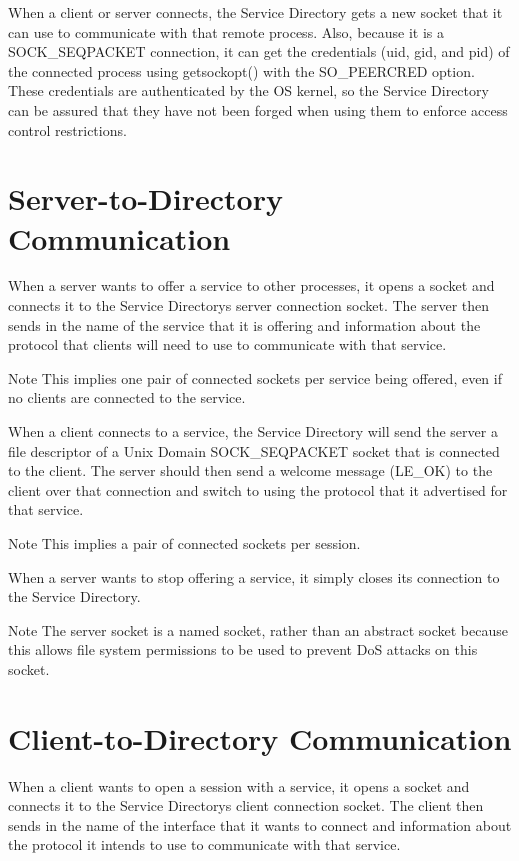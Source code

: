 When a client or server connects, the Service Directory gets a new socket that it can use to communicate with that remote process. Also, because it is a S\+O\+C\+K\+\_\+\+S\+E\+Q\+P\+A\+C\+K\+ET connection, it can get the credentials (uid, gid, and pid) of the connected process using getsockopt() with the S\+O\+\_\+\+P\+E\+E\+R\+C\+R\+ED option. These credentials are authenticated by the OS kernel, so the Service Directory can be assured that they have not been forged when using them to enforce access control restrictions.\hypertarget{serviceDirectoryProtocol_serviceDirectoryProtocol_Servers}{}\section{Server-\/to-\/\+Directory Communication}\label{serviceDirectoryProtocol_serviceDirectoryProtocol_Servers}
When a server wants to offer a service to other processes, it opens a socket and connects it to the Service Directory\textquotesingle{}s server connection socket. The server then sends in the name of the service that it is offering and information about the protocol that clients will need to use to communicate with that service.

\begin{DoxyNote}{Note}
This implies one pair of connected sockets per service being offered, even if no clients are connected to the service.
\end{DoxyNote}
When a client connects to a service, the Service Directory will send the server a file descriptor of a Unix Domain S\+O\+C\+K\+\_\+\+S\+E\+Q\+P\+A\+C\+K\+ET socket that is connected to the client. The server should then send a welcome message (L\+E\+\_\+\+OK) to the client over that connection and switch to using the protocol that it advertised for that service.

\begin{DoxyNote}{Note}
This implies a pair of connected sockets per session.
\end{DoxyNote}
When a server wants to stop offering a service, it simply closes its connection to the Service Directory.

\begin{DoxyNote}{Note}
The server socket is a named socket, rather than an abstract socket because this allows file system permissions to be used to prevent DoS attacks on this socket.
\end{DoxyNote}
\hypertarget{serviceDirectoryProtocol_serviceDirectoryProtocol_Clients}{}\section{Client-\/to-\/\+Directory Communication}\label{serviceDirectoryProtocol_serviceDirectoryProtocol_Clients}
When a client wants to open a session with a service, it opens a socket and connects it to the Service Directory\textquotesingle{}s client connection socket. The client then sends in the name of the interface that it wants to connect and information about the protocol it intends to use to communicate with that service.

